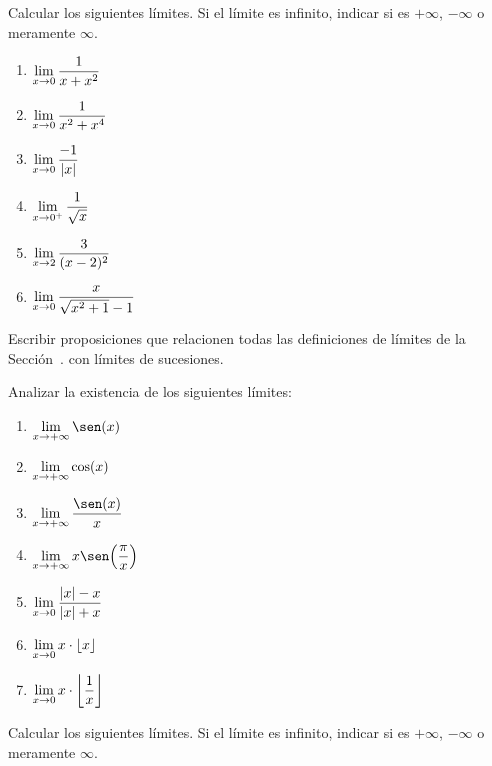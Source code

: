 \item Calcular los siguientes límites.
 Si el límite es infinito, indicar si es $+\infty$, $-\infty$ o meramente $\infty$.
   
\begin{multicols}{2}
    \begin{enumerate}
        \item $\displaystyle\lim_{x\to0} \frac{1}{x+x^2}$
        \item $\displaystyle\lim_{x\to0} \frac{1}{x^2+x^4}$
        \item $\displaystyle\lim_{x\to0} \frac{-1}{|x|}$
        \item $\displaystyle\lim_{x\to0^+} \frac{1}{\sqrt x}$
        \item $\displaystyle\lim_{x\to2} \frac{3}{(x-2)^2}$
        \item $\displaystyle\lim_{x\to0} \frac{x}{\sqrt{x^2+1}-1}$
    \end{enumerate}
\end{multicols}

\item Escribir proposiciones que relacionen todas las definiciones de límites de la Sección~. con límites de sucesiones.

\item Analizar la existencia de los siguientes límites:
   
\begin{multicols}{2}
    \begin{enumerate}
        \item $\D\lim_{x\to+\infty} \sen(x)$
        \item $\displaystyle\lim_{x\to+\infty} \cos(x)$
        \item $\D\lim_{x\to+\infty} \frac{\sen(x)}x$
        \item $\D\lim_{x\to+\infty} x\sen\Big(\frac\pi x\Big)$
        \item $\displaystyle\lim_{x\to0} \frac{|x|-x}{|x|+x}$
        \item $\displaystyle\lim_{x\to0} x\cdot\lfloor x \rfloor$
        \item $\displaystyle\lim_{x\to0} x\cdot\bigg\lfloor \frac1x \bigg\rfloor$
    \end{enumerate}
\end{multicols}

\item Calcular los siguientes límites.
 Si el límite es infinito, indicar si es $+\infty$, $-\infty$ o meramente $\infty$.
   
